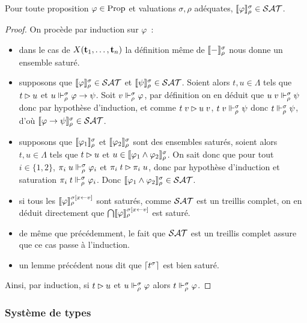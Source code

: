 \documentclass{article}
\begin{document}
\begin{lem}[Saturation]
  Pour toute proposition $\varphi \in \mathrm{Prop}$ et valuations $\sigma,\rho$ adéquates, $\llbracket \varphi \rrbracket_\rho^\sigma\in\mathcal {SAT}$.
\end{lem}

\begin{proof}
  On procède par induction sur $\varphi$~:
  \begin{itemize}
  \item dans le cas de $X(\mathbf{t}_1,\ldots,\mathbf{t}_n)$ la définition même de $\llbracket - \rrbracket_\rho^\sigma$ nous donne un ensemble saturé.
  \item supposons que $\llbracket \varphi \rrbracket_\rho^\sigma\in\mathcal {SAT}$ et $\llbracket \psi \rrbracket_\rho^\sigma\in \mathcal {SAT}$. Soient alors $t,u\in\Lambda$ tels que $t\rhd u$ et $u \Vdash_\rho^\sigma \varphi \to \psi$. Soit $v\Vdash_\rho^\sigma\varphi$, par définition on en déduit que $u\;v\Vdash_\rho^\sigma \psi$ donc par hypothèse d'induction, et comme $t\;v\rhd u\;v$, $t\;v\Vdash_\rho^\sigma\psi$ donc $t\Vdash_\rho^\sigma\psi$, d'où $\llbracket \varphi\to\psi \rrbracket_\rho^\sigma \in\mathcal {SAT}$.
  \item supposons que $\llbracket \varphi_1 \rrbracket_\rho^\sigma$ et $\llbracket \varphi_2 \rrbracket_\rho^\sigma$ sont des ensembles saturés, soient alors $t, u \in \Lambda$ tels que $t\rhd u$ et $u \in \llbracket \varphi_1\land \varphi_2 \rrbracket_\rho^\sigma$. On sait donc que pour tout $i\in\{1,2\}$, $\pi_i\;u \Vdash_\rho^\sigma \varphi_i$ et $\pi_i\;t\rhd\pi_i\;u$, donc par hypothèse d'induction et saturation $\pi_i\;t\Vdash_\rho^\sigma\varphi_i$. Donc $\llbracket \varphi_1\land\varphi_2 \rrbracket_\rho^\sigma\in\mathcal {SAT}$.
  \item si tous les $\llbracket \varphi \rrbracket_\rho^{\sigma[x\leftarrow v]}$ sont saturés, comme $\mathcal {SAT}$ est un treillis complet, on en déduit directement que $\bigcap \llbracket \varphi \rrbracket_\rho^{\sigma[x\leftarrow v]}$ est saturé.
  \item de même que précédemment, le fait que $\mathcal {SAT}$ est un treillis complet assure que ce cas passe à l'induction.
  \item un lemme précédent nous dit que $\lceil t^\sigma \rceil$ est bien saturé.
  \end{itemize}

  Ainsi, par induction, si $t\rhd u$ et $u\Vdash_\rho^\sigma \varphi$ alors $t\Vdash_\rho^\sigma\varphi$.
\end{proof}

\subsubsection{Système de types}
\end{document}
